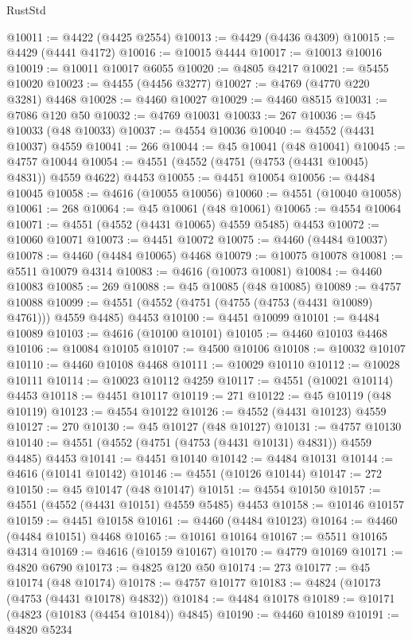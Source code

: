 \begin{lexlean}{RustStd}
\begin{coremodule}
@10011 := @4422 (@4425 @2554)
@10013 := @4429 (@4436 @4309)
@10015 := @4429 (@4441 @4172)
@10016 := @10015 @4444
@10017 := @10013 @10016
@10019 := @10011 @10017 @6055
@10020 := @4805 @4217
@10021 := @5455 @10020
@10023 := @4455 (@4456 @3277)
@10027 := @4769 (@4770 @220 @3281) @4468
@10028 := @4460 @10027
@10029 := @4460 @8515
@10031 := @7086 @120 @50
@10032 := @4769 @10031
@10033 := 267
@10036 := @45 @10033 (@48 @10033)
@10037 := @4554 @10036
@10040 := @4552 (@4431 @10037) @4559
@10041 := 266
@10044 := @45 @10041 (@48 @10041)
@10045 := @4757 @10044
@10054 := @4551 (@4552 (@4751 (@4753 (@4431 @10045) @4831)) @4559 @4622) @4453
@10055 := @4451 @10054
@10056 := @4484 @10045
@10058 := @4616 (@10055 @10056)
@10060 := @4551 (@10040 @10058)
@10061 := 268
@10064 := @45 @10061 (@48 @10061)
@10065 := @4554 @10064
@10071 := @4551 (@4552 (@4431 @10065) @4559 @5485) @4453
@10072 := @10060 @10071
@10073 := @4451 @10072
@10075 := @4460 (@4484 @10037)
@10078 := @4460 (@4484 @10065) @4468
@10079 := @10075 @10078
@10081 := @5511 @10079 @4314
@10083 := @4616 (@10073 @10081)
@10084 := @4460 @10083
@10085 := 269
@10088 := @45 @10085 (@48 @10085)
@10089 := @4757 @10088
@10099 := @4551 (@4552 (@4751 (@4755 (@4753 (@4431 @10089) @4761))) @4559 @4485) @4453
@10100 := @4451 @10099
@10101 := @4484 @10089
@10103 := @4616 (@10100 @10101)
@10105 := @4460 @10103 @4468
@10106 := @10084 @10105
@10107 := @4500 @10106
@10108 := @10032 @10107
@10110 := @4460 @10108 @4468
@10111 := @10029 @10110
@10112 := @10028 @10111
@10114 := @10023 @10112 @4259
@10117 := @4551 (@10021 @10114) @4453
@10118 := @4451 @10117
@10119 := 271
@10122 := @45 @10119 (@48 @10119)
@10123 := @4554 @10122
@10126 := @4552 (@4431 @10123) @4559
@10127 := 270
@10130 := @45 @10127 (@48 @10127)
@10131 := @4757 @10130
@10140 := @4551 (@4552 (@4751 (@4753 (@4431 @10131) @4831)) @4559 @4485) @4453
@10141 := @4451 @10140
@10142 := @4484 @10131
@10144 := @4616 (@10141 @10142)
@10146 := @4551 (@10126 @10144)
@10147 := 272
@10150 := @45 @10147 (@48 @10147)
@10151 := @4554 @10150
@10157 := @4551 (@4552 (@4431 @10151) @4559 @5485) @4453
@10158 := @10146 @10157
@10159 := @4451 @10158
@10161 := @4460 (@4484 @10123)
@10164 := @4460 (@4484 @10151) @4468
@10165 := @10161 @10164
@10167 := @5511 @10165 @4314
@10169 := @4616 (@10159 @10167)
@10170 := @4779 @10169
@10171 := @4820 @6790
@10173 := @4825 @120 @50
@10174 := 273
@10177 := @45 @10174 (@48 @10174)
@10178 := @4757 @10177
@10183 := @4824 (@10173 (@4753 (@4431 @10178) @4832))
@10184 := @4484 @10178
@10189 := @10171 (@4823 (@10183 (@4454 @10184)) @4845)
@10190 := @4460 @10189
@10191 := @4820 @5234

\end{coremodule}
\end{lexlean}
